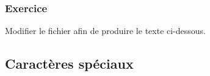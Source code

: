 \begin{frame}
  \frametitle{Exercice}

  Modifier le fichier  afin de
  produire le texte ci-dessous.

  \vspace{18pt}
\end{frame}

\subsection{Caractères spéciaux}

